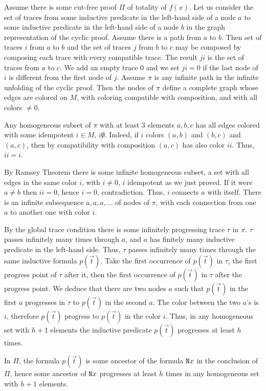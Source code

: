 \documentclass[a4paper,12pt]{article}
\newenvironment{proof}[1][Proof]{\begin{trivlist}
\item[\hskip \labelsep {\bfseries #1}]}{\end{trivlist}}
\newcommand{\Nat}               { {\tt N}  }
\begin{document}
\begin{proof}
Assume there is some cut-free proof $\Pi$ of totality of $f(x)$. Let us consider the set of traces from some inductive predicate in the left-hand side of a node $a$ to some inductive predicate in the left-hand side of a node $b$ in the graph representation of the cyclic proof. Assume there is a path from $a$ to $b$. Then set of traces $i$ from $a$ to $b$ and the set of traces $j$ from $b$ to $c$ may be composed by composing each trace with every compatible trace. The result $ji$ is the set of traces from $a $ to $c$. We add an empty trace $0$ and we set $ji = 0$ if the last node of $i$ is different from the first node of $j$. Assume $\pi$ is any infinite path in the infinite unfolding of the cyclic proof. Then the nodes of $\pi$ define a complete graph whose edges are colored on $M$, with coloring compatible with composition, and with all colors $\not = 0$.  

Any homogeneous subset of $\pi$ with at least $3$ elements $a,b,c$ has all edges colored with some idempotent $i \in M$, $i \not 0$. Indeed, if $i$ colors $(a,b)$ and $(b,c)$ and $(a,c)$, then by compatibility with composition $(a,c)$ has also color $ii$. Thus, $ii = i$. 

By Ramsey Theorem there is some infinite homogeneous subset, a set with all edges in the same color $i$, with $i \not = 0$, $i$ idempotent as we just proved. If it were $a \not = b$ then $ii = 0$, hence $i=0$, contradiction. Thus, $i$ connects $a$ with itself. There is an infinite subsequence $a,a,a,\ldots$ of nodes of $\pi$, with each connection from one $a$ to another one with color $i$.

By the global trace condition there is some infinitely progressing trace $\tau$ in $\pi$. $\tau$ passes  infinitely many times through $a$, and $a$ has finitely many inductive predicate in the left-hand side. Thus, $\tau$ passes infinitely many times through the same inductive formula $p(\vec{t})$. Take the first occurrence of $p(\vec{t})$ in $\tau$, the first progress point of $\tau$ after it, then the first occurrence of $p(\vec{t})$ in $\tau$ after the progress point. We deduce that there are two nodes $a$ such that $p(\vec{t})$ in the first $a$ progresses in $\tau$ to $p(\vec{t})$ in the second $a$. The color between the two $a$'s is $i$, therefore $p(\vec{t})$ progress to $p(\vec{t})$ in the color $i$. Thus, in any homogeneous set with $h+1$ elements the inductive predicate $p(\vec{t})$ progresses at least $h$ times. 

In $\Pi$, the formula $p(\vec{t})$ is some ancestor of the formula $\Nat x$ in the conclusion of $\Pi$, hence some ancestor of $\Nat x$ progresses at least $h$ times in any homogeneous set with $h+1$ elements. 


\end{proof}
\end{document}
